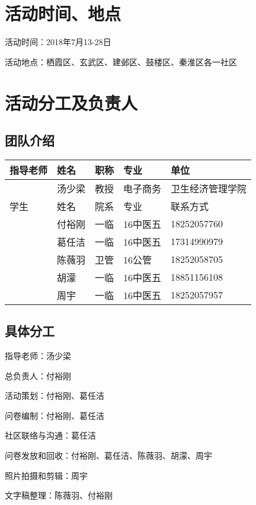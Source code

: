 \documentclass[12pt]{ctexart}
\begin{document}
    \section{活动时间、地点}
    活动时间：2018年7月13-28日
    
    活动地点：栖霞区、玄武区、建邺区、鼓楼区、秦淮区各一社区
    \section{活动分工及负责人}
    \subsection{团队介绍}
    \begin{table}[ht]
        \centering
        \begin{tabular}{|l|l|l|l|l|}
            \hline
          指导老师  & 姓名 & 职称 & 专业 & 单位 \\ \hline
            & 汤少梁 & 教授 & 电子商务 & 卫生经济管理学院 \\ \hline
           学生 & 姓名 & 院系 & 专业 & 联系方式 \\ \hline
            & 付裕刚 & 一临 & 16中医五 & 18252057760 \\ \hline
            & 葛任洁 & 一临 & 16中医五 & 17314990979  \\ \hline
            & 陈薇羽 & 卫管 & 16公管 & 18252058705
             \\ \hline
            & 胡濛 & 一临 & 16中医五 &18851156108  \\ \hline
            & 周宇 & 一临 & 16中医五 & 18252057957
             \\ \hline
        \end{tabular}
    \end{table}
    \subsection{具体分工}
    指导老师：汤少梁 
    
    总负责人：付裕刚
    
    活动策划：付裕刚、葛任洁
    
    问卷编制：付裕刚、葛任洁
    
    社区联络与沟通：葛任洁
    
    问卷发放和回收：付裕刚、葛任洁、陈薇羽、胡濛、周宇
    
    照片拍摄和剪辑：周宇
    
    文字稿整理：陈薇羽、付裕刚
    
\end{document}
